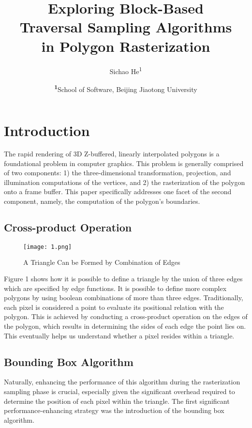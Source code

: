 \documentclass[
	a4paper, %
	10pt, %
	unnumberedsections, %
	twoside, %
]{LTJournalArticle}
\title{Exploring Block-Based\\ Traversal Sampling Algorithms\\  in Polygon Rasterization} %
\author{%
	Sichao He\textsuperscript{1}
}
\date{\footnotesize\textsuperscript{\textbf{1}}School of Software, Beijing Jiaotong University}
\begin{document}
\maketitle %


\section{Introduction}

The rapid rendering of 3D Z-buffered, linearly interpolated polygons is a foundational problem in computer graphics. This problem is generally comprised of two components: 1) the three-dimensional transformation, projection, and illumination computations of the vertices, and 2) the rasterization of the polygon onto a frame buffer. This paper specifically addresses one facet of the second component, namely, the computation of the polygon's boundaries.


\subsection{Cross-product Operation}
\begin{figure}[H] %
	\texttt{[image: 1.png]}
	\caption{A Triangle Can be Formed by Combination of Edges}
\end{figure}

Figure 1 shows how it is possible to define a triangle by the union of three edges which are specified by edge functions. It is possible to define more complex polygons by using boolean combinations of more than three edges.
Traditionally, each pixel is considered a point to evaluate its positional relation with the polygon. This is achieved by conducting a cross-product operation on the edges of the polygon, which results in determining the sides of each edge the point lies on. This eventually helps us understand whether a pixel resides within a triangle.\cite{pineda1988}

\subsection{Bounding Box Algorithm}

Naturally, enhancing the performance of this algorithm during the rasterization sampling phase is crucial, especially given the significant overhead required to determine the position of each pixel within the triangle. The first significant performance-enhancing strategy was the introduction of the bounding box algorithm.
\end{document}
